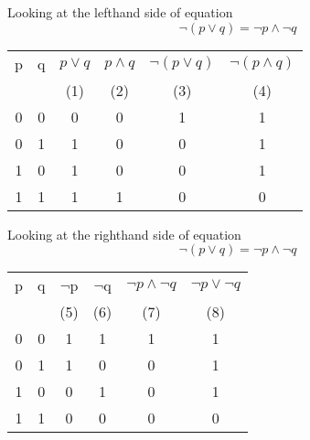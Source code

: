 \noindent	Looking at the lefthand side of equation
{\LARGE	\[  \neg (p \vee q) = \neg p \wedge \neg q\]
}	
\bigskip
{
	\Large
\begin{center}
	\begin{tabular}{|c|c||c|c|c|c|}
		\hline
		p	&	q	&	$ p \vee q$	&	$ p \wedge q$&	$\neg (p \vee q)$	&	$\neg (p \wedge q)$\\
		&		&	(1)	&	(2)	&	(3)	&	(4)	\\ \hline
		\phantom{sp}0\phantom{sp}	&	\phantom{sp}0\phantom{sp}	&	\phantom{sp}0\phantom{sp}	&	\phantom{sp}0\phantom{sp}	&	1	&	1 \\
		0	&	1	&	1	&	0	&	0	&	1\\
		1	&	0	&	1	&	0	&	0	&	1\\
		1	&	1	&	1	&	1	&	\phantom{sp}0\phantom{sp}	&	\phantom{sp}0\phantom{sp}\\
		\hline
	\end{tabular}
\end{center}
}
\bigskip
\noindent	Looking at the righthand side of equation
	\[  \neg (p \vee q) = \neg p \wedge \neg q\]
	\begin{center}
		\begin{tabular}{|c|c||c|c|c|c|}
			\hline
			p	&	q	&	$\neg$p	&	$\neg$q	&	$\neg p \wedge \neg q$	&	$\neg p \vee \neg q$ \\ 
			&		&	(5)	&	(6)	&	(7)	&	(8)	\\
			\hline
			\phantom{sp}0\phantom{sp}	&	\phantom{sp}0\phantom{sp}	&	1	&	1	&	1	&	1	\\
			0	&	1	&	1	&	0	&	0	&	1	\\
			1	&	0	&	0	&	1	&	0	&	1	\\
			1	&	1	&	\phantom{sp}0\phantom{sp}	&	\phantom{sp}0\phantom{sp}	&	\phantom{sp}0\phantom{sp}	&	\phantom{sp}0\phantom{sp}	\\
			\hline
		\end{tabular}
	\end{center}



